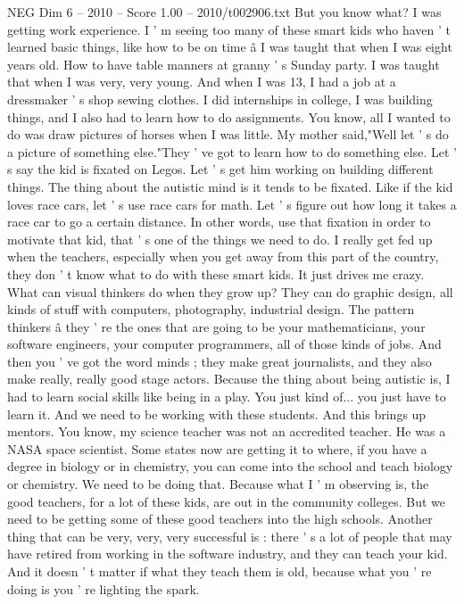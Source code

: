 \begin{textsample}{NEG Dim 6 – 2010 – Score 1.00 – 2010/t002906.txt}
But you know what?
I was getting work experience.
I ' m seeing too many of these smart kids who haven ' t learned basic things, like how to be on time â I was taught that when I was eight years old.
How to have table manners at granny ' s Sunday party.
I was taught that when I was very, very young.
And when I was 13, I had a job at a dressmaker ' s shop sewing clothes.
I did internships in college, I was building things, and I also had to learn how to do assignments.
You know, all I wanted to do was draw pictures of horses when I was little.
My mother said,"Well let ' s do a picture of something else."They ' ve got to learn how to do something else.
Let ' s say the kid is fixated on Legos.
Let ' s get him working on building different things.
The thing about the autistic mind is it tends to be fixated.
Like if the kid loves race cars, let ' s use race cars for math.
Let ' s figure out how long it takes a race car to go a certain distance.
In other words, use that fixation in order to motivate that kid, that ' s one of the things we need to do.
I really get fed up when the teachers, especially when you get away from this part of the country, they don ' t know what to do with these smart kids.
It just drives me crazy.
What can visual thinkers do when they grow up?
They can do graphic design, all kinds of stuff with computers, photography, industrial design.
The pattern thinkers â they ' re the ones that are going to be your mathematicians, your software engineers, your computer programmers, all of those kinds of jobs.
And then you ' ve got the word minds ; they make great journalists, and they also make really, really good stage actors.
Because the thing about being autistic is, I had to learn social skills like being in a play.
You just kind of... you just have to learn it.
And we need to be working with these students.
And this brings up mentors.
You know, my science teacher was not an accredited teacher.
He was a NASA space scientist.
Some states now are getting it to where, if you have a degree in biology or in chemistry, you can come into the school and teach biology or chemistry.
We need to be doing that.
Because what I ' m observing is, the good teachers, for a lot of these kids, are out in the community colleges.
But we need to be getting some of these good teachers into the high schools.
Another thing that can be very, very, very successful is : there ' s a lot of people that may have retired from working in the software industry, and they can teach your kid.
And it doesn ' t matter if what they teach them is old, because what you ' re doing is you ' re lighting the spark.

\end{textsample}
